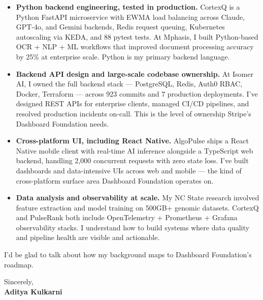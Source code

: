 \documentclass[11pt]{article}
\begin{document}
\begin{itemize}[leftmargin=1.2em, itemsep=4pt]
  \item[\textcolor{StripePurple}{\faAngleRight}] \textbf{Python backend engineering, tested in production.} CortexQ is a Python FastAPI microservice with EWMA load balancing across Claude, GPT-4o, and Gemini backends, Redis request queuing, Kubernetes autoscaling via KEDA, and 88 pytest tests. At Mphasis, I built Python-based OCR + NLP + ML workflows that improved document processing accuracy by 25\% at enterprise scale. Python is my primary backend language.
  \item[\textcolor{StripePurple}{\faAngleRight}] \textbf{Backend API design and large-scale codebase ownership.} At Isomer AI, I owned the full backend stack — PostgreSQL, Redis, Auth0 RBAC, Docker, Terraform — across 923 commits and 7 production deployments. I've designed REST APIs for enterprise clients, managed CI/CD pipelines, and resolved production incidents on-call. This is the level of ownership Stripe's Dashboard Foundation needs.
  \item[\textcolor{StripePurple}{\faAngleRight}] \textbf{Cross-platform UI, including React Native.} AlgoPulse ships a React Native mobile client with real-time AI inference alongside a TypeScript web backend, handling 2,000 concurrent requests with zero state loss. I've built dashboards and data-intensive UIs across web and mobile — the kind of cross-platform surface area Dashboard Foundation operates on.
  \item[\textcolor{StripePurple}{\faAngleRight}] \textbf{Data analysis and observability at scale.} My NC State research involved feature extraction and model training on 500GB+ genomic datasets. CortexQ and PulseRank both include OpenTelemetry + Prometheus + Grafana observability stacks. I understand how to build systems where data quality and pipeline health are visible and actionable.
\end{itemize}

\vspace{8pt}

I'd be glad to talk about how my background maps to Dashboard Foundation's roadmap.

\vspace{10pt}

Sincerely, \\[4pt]
\textbf{Aditya Kulkarni}
\end{document}
